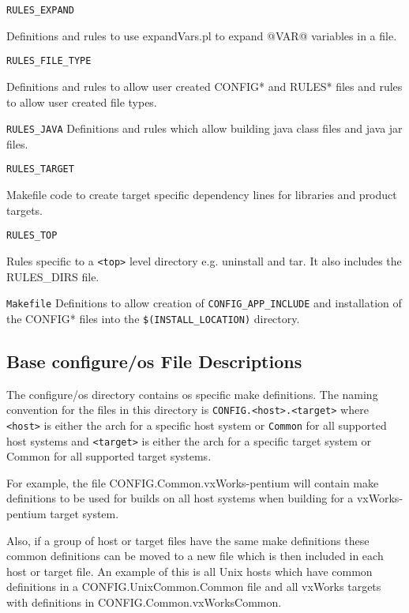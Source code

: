 \begin{description}
\item {}\verb|RULES_EXPAND|

Definitions and rules to use expandVars.pl to expand @VAR@ variables in a file.

\item {}\verb|RULES_FILE_TYPE|

Definitions and rules to allow user created CONFIG* and RULES* files and rules to allow user created file types.

\item {}\verb|RULES_JAVA| 
Definitions and rules which allow building java class files and java jar files.

\item {}\verb|RULES_TARGET|

Makefile code to create target specific dependency lines for libraries and product targets.

\item {}\verb|RULES_TOP|

Rules specific to a \verb|<top>| level directory e.g. uninstall and tar. It also includes the RULES\_DIRS file.

\item {}\verb|Makefile|
Definitions to allow creation of \verb|CONFIG_APP_INCLUDE| and installation of the CONFIG* files into the 
\verb|$(INSTALL_LOCATION)| directory.

\end{description}

\subsection{Base configure/os File Descriptions}

The configure/os directory contains os specific make definitions. The naming convention for the files in this directory is 
\verb|CONFIG.<host>.<target>| where \verb|<host>| is either the arch for a specific host system or \verb|Common| for all supported host 
systems and \verb|<target>| is either the arch for a specific target system or Common for all supported target systems. 

For example, the file CONFIG.Common.vxWorks-pentium will contain make definitions to be used for builds on all host 
systems when building for a vxWorks-pentium target system.

Also, if a group of host or target files have the same make definitions these common definitions can be moved to a new 
file which is then included in each host or target file. An example of this is all Unix hosts which have common definitions 
in a CONFIG.UnixCommon.Common file and all vxWorks targets with definitions in 
CONFIG.Common.vxWorksCommon.

